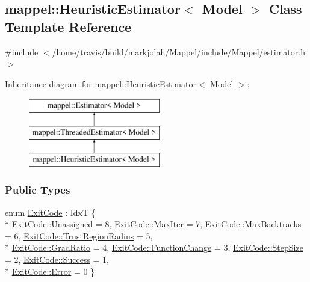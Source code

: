 \hypertarget{classmappel_1_1HeuristicEstimator}{}\subsection{mappel\+:\+:Heuristic\+Estimator$<$ Model $>$ Class Template Reference}
\label{classmappel_1_1HeuristicEstimator}


{\ttfamily \#include $<$/home/travis/build/markjolah/\+Mappel/include/\+Mappel/estimator.\+h$>$}

Inheritance diagram for mappel\+:\+:Heuristic\+Estimator$<$ Model $>$\+:\begin{figure}[H]
\begin{center}
\leavevmode
\includegraphics[height=3.000000cm]{classmappel_1_1HeuristicEstimator}
\end{center}
\end{figure}
\subsubsection*{Public Types}
\begin{DoxyCompactItemize}
\item 
enum \hyperlink{classmappel_1_1Estimator_a6d599915907ba4d0607fcb958d231edc}{Exit\+Code} \+: IdxT \{ \\*
\hyperlink{classmappel_1_1Estimator_a6d599915907ba4d0607fcb958d231edca3476bf9c3af766198bfbd4f065a51e69}{Exit\+Code\+::\+Unassigned} = 8, 
\hyperlink{classmappel_1_1Estimator_a6d599915907ba4d0607fcb958d231edcabbf52264f7a6e91c48a242f95aeed3db}{Exit\+Code\+::\+Max\+Iter} = 7, 
\hyperlink{classmappel_1_1Estimator_a6d599915907ba4d0607fcb958d231edca9e5d3183756d69b44432394db6b6fd86}{Exit\+Code\+::\+Max\+Backtracks} = 6, 
\hyperlink{classmappel_1_1Estimator_a6d599915907ba4d0607fcb958d231edcaadd208e6fbd6ef5ab84a287f259c3b81}{Exit\+Code\+::\+Trust\+Region\+Radius} = 5, 
\\*
\hyperlink{classmappel_1_1Estimator_a6d599915907ba4d0607fcb958d231edca8d0cc41d71102a7952fefe3c63244fd4}{Exit\+Code\+::\+Grad\+Ratio} = 4, 
\hyperlink{classmappel_1_1Estimator_a6d599915907ba4d0607fcb958d231edca8d75b053f108781c02ac7c22facc4338}{Exit\+Code\+::\+Function\+Change} = 3, 
\hyperlink{classmappel_1_1Estimator_a6d599915907ba4d0607fcb958d231edca071449462d0c247e47313eb8c3129dd0}{Exit\+Code\+::\+Step\+Size} = 2, 
\hyperlink{classmappel_1_1Estimator_a6d599915907ba4d0607fcb958d231edca505a83f220c02df2f85c3810cd9ceb38}{Exit\+Code\+::\+Success} = 1, 
\\*
\hyperlink{classmappel_1_1Estimator_a6d599915907ba4d0607fcb958d231edca902b0d55fddef6f8d651fe1035b7d4bd}{Exit\+Code\+::\+Error} = 0
 \}
\end{DoxyCompactItemize}
